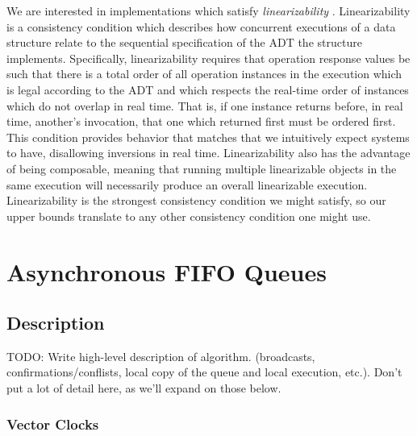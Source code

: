 \documentclass[a4paper,anonymous,USenglish]{lipics-v2021} %
\theoremstyle{definition}
\begin{document}
We are interested in implementations which satisfy \emph{linearizability} \cite{HerlihyWing90}.  Linearizability is a consistency condition which describes how concurrent executions of a data structure relate to the sequential specification of the ADT the structure implements.  Specifically, linearizability requires that operation response values be such that there is a total order of all operation instances in the execution which is legal according to the ADT and which respects the real-time order of instances which do not overlap in real time.  That is, if one instance returns before, in real time, another's invocation, that one which returned first must be ordered first.  This condition provides behavior that matches that we intuitively expect systems to have, disallowing inversions in real time.  Linearizability also has the advantage of being composable, meaning that running multiple linearizable objects in the same execution will necessarily produce an overall linearizable execution.  Linearizability is the strongest consistency condition we might satisfy, so our upper bounds translate to any other consistency condition one might use.


\section{Asynchronous FIFO Queues}

\subsection{Description}

TODO: Write high-level description of algorithm. (broadcasts, confirmations/conflists, local copy of the queue and local execution, etc.).  Don't put a lot of detail here, as we'll expand on those below.

\subsubsection{Vector Clocks}
\end{document}
